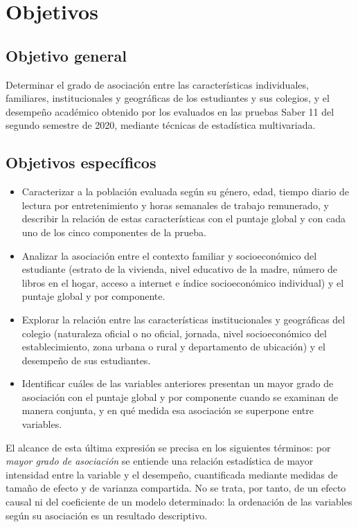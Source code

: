 \documentclass[12pt]{article}
\newcommand{\corr}[1]{\textcolor{azulcorr}{#1}}
\newenvironment{correccion}{\par\color{azulcorr}}{\par}
\begin{document}
\section{Objetivos}

\subsection{Objetivo general}
Determinar el grado de asociación entre las características individuales, familiares,
institucionales y geográficas de los estudiantes y sus colegios, y el desempeño académico
obtenido por \corr{los evaluados} en las pruebas Saber 11 del
segundo semestre de 2020, mediante técnicas de estadística multivariada.

\subsection{Objetivos específicos}
\begin{itemize}[leftmargin=1.8em, itemsep=0.4em, topsep=0.3em]
    \item \corr{Caracterizar a la población evaluada según su género, edad, tiempo diario
    de lectura por entretenimiento y horas semanales de trabajo remunerado, y describir
    la relación de estas características con el puntaje global y con cada uno de los cinco
    componentes de la prueba.}

    \item \corr{Analizar la asociación entre el contexto familiar y socioeconómico del
    estudiante (estrato de la vivienda, nivel educativo de la madre, número de libros en el
    hogar, acceso a internet e índice socioeconómico individual) y el puntaje global y por
    componente.}

    \item \corr{Explorar la relación entre las características institucionales y
    geográficas del colegio (naturaleza oficial o no oficial, jornada, nivel socioeconómico
    del establecimiento, zona urbana o rural y departamento de ubicación) y el desempeño
    de sus estudiantes.}

    \item \corr{Identificar cuáles de las variables anteriores presentan un mayor grado
    de asociación con el puntaje global y por componente cuando se examinan de manera
    conjunta, y en qué medida esa asociación se superpone entre variables.}
\end{itemize}

\begin{correccion}
El alcance de esta última expresión se precisa en los siguientes términos: por
\textit{mayor grado de asociación} se entiende una relación estadística de mayor
intensidad entre la variable y el desempeño, cuantificada mediante medidas de tamaño
de efecto y de varianza compartida. No se trata, por tanto, de un efecto causal ni del
coeficiente de un modelo determinado: la ordenación de las variables según su
asociación es un resultado descriptivo.
\end{correccion}
\end{document}
